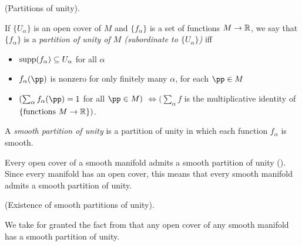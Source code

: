 \begin{defn}
     (Partitions of unity).
    
    If $\{U_\alpha\}$ is an open cover of $M$ and  $\{f_\alpha\}$ is a set of functions $M \rightarrow \mathbb{R}$, we say that $\{f_\alpha\}$ is a \textit{partition of unity of $M$ (subordinate to $\{U_\alpha\}$)} iff
    
    \begin{itemize}
        \item $\text{supp}(f_\alpha) \subseteq U_\alpha$ for all $\alpha$
        \item $f_\alpha(\pp)$ is nonzero for only finitely many $\alpha$, for each $\pp \in M$
        \item $(\sum_\alpha f_\alpha(\pp) = 1$ for all $\pp \in M)$ $\iff (\sum_\alpha f$ is the multiplicative identity of $\{\text{functions } M \rightarrow \mathbb{R}\})$.
    \end{itemize}
    
    A \textit{smooth partition of unity} is a partition of unity in which each function $f_\alpha$ is smooth.
    
    Every open cover of a smooth manifold admits a smooth partition of unity (\cite[p. 43]{book::SM}). Since every manifold has an open cover, this means that every smooth manifold admits a smooth partition of unity.
\end{defn}

\begin{theorem}
     (Existence of smooth partitions of unity).
    
    We take for granted the fact from \cite{book::SM} that any open cover of any smooth manifold has a smooth partition of unity.
\end{theorem}

